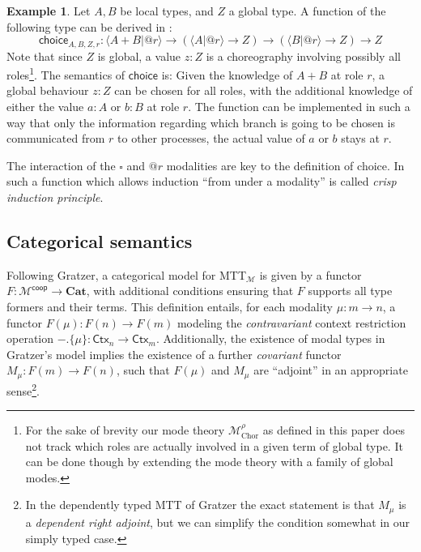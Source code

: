 \documentclass{scrartcl}
\theoremstyle{definition}
\newtheorem{example}{Example}
\theoremstyle{plain}
\begin{document}
\begin{example}
  Let $A, B$ be local types, and $Z$ a global type. A function of the following
  type can be derived in \ChorMTT:
  \[
    \textsf{choice}_{A,B,Z,r} : \langle A + B | @r \rangle
    \to (\langle A | @r \rangle \to Z)
    \to (\langle B | @r \rangle \to Z)
    \to Z
  \]
  Note that since $Z$ is global, a value $z : Z$ is a choreography involving
  possibly all roles\footnote{For the sake of brevity our mode theory
    $\mathcal{M}^{\rho}_{\textrm{Chor}}$ as defined in this paper does not track which
    roles are actually involved in a given term of global type. It can be done
    though by extending the mode theory with a family of global modes.}. The semantics
  of $\textsf{choice}$ is: Given the knowledge of $A + B$ at role $r$, a global behaviour
  $z : Z$ can be chosen for all roles, with the additional knowledge of either
  the value $a : A$ or $b : B$ at role $r$. The function can be implemented in
  such a way that only the information regarding which branch is going to be
  chosen is communicated from $r$ to other processes, the actual value of $a$ or
  $b$ stays at $r$.

  The interaction of the $\square$ and $@r$ modalities are key to the definition
  of choice. In \cite{gratzer2023syntax} such a function which allows induction ``from under a
  modality'' is called \textit{crisp induction principle}.
\end{example}

\subsection{Categorical semantics}
Following Gratzer, a categorical model for MTT$_{\mathcal{M}}$ is given by a
functor $F : \mathcal{M}^{\textsf{coop}} \to \textbf{Cat}$, with additional
conditions ensuring that $F$ supports all type formers and their terms. This
definition entails, for each modality $\mu : m \to n$, a functor
$F(\mu) : F(n) \to F(m)$ modeling the \textit{contravariant} context restriction
operation ${-}.\{\mu\} : \textsf{Ctx}_n \to \textsf{Ctx}_m$. Additionally, the
existence of modal types in Gratzer's model implies the existence of a further
\textit{covariant} functor $M_\mu : F(m) \to F(n)$, such that $F(\mu)$ and
$M_\mu$ are ``adjoint'' in an appropriate sense\footnote{In the dependently
  typed MTT of Gratzer the exact statement is that $M_\mu$ is a
  \textit{dependent right adjoint}, but we can simplify the condition somewhat
  in our simply typed case.}.
\end{document}

